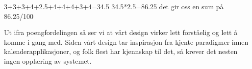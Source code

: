 
3+3+3+4+2.5+4+4+4+3+4=34.5
34.5*2.5=86.25
det gir oss en sum på 86.25/100

Ut ifra poengfordelingen så ser vi at vårt design virker lett forståelig og lett å komme i gang med. Siden vårt design tar inspirasjon fra kjente paradigmer innen kalenderapplikasjoner, og folk flest har kjennskap til det, så krever det nesten ingen opplæring av systemet.